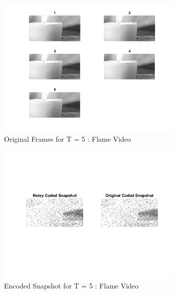 \documentclass[a4paper,12pt]{article}
\begin{document}
\begin{figure}[htbp]
  \centering
  \includegraphics[width=0.8\textwidth]{../images/original_frames_flame.png}
  \caption{Original Frames for T = 5 : Flame Video}
  \label{fig:output}
\end{figure}

\begin{figure}[htbp]
  \centering
  \includegraphics[width=0.8\textwidth]{../images/noisy_coded_snapshot_flame.png}
  \caption{Encoded Snapshot for T = 5 : Flame Video}
  \label{fig:output}
\end{figure}

\end{document}
